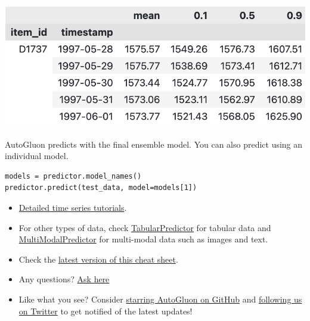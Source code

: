\begin{center}
\includegraphics[width=0.6\linewidth]{timeseries/images/predictions.png}
\end{center}

\medskip

AutoGluon predicts with the final ensemble model. You can also predict using an individual model. 

\begin{verbatim}
models = predictor.model_names()
predictor.predict(test_data, model=models[1])
\end{verbatim}




\begin{itemize}
  \item \href{https://auto.gluon.ai/stable/tutorials/timeseries/index.html}{Detailed  time series tutorials}.
  \item For other types of data, check
  \href{https://auto.gluon.ai/stable/tutorials/tabular/index.html}{TabularPredictor} for tabular data and 
  \href{https://auto.gluon.ai/stable/tutorials/multimodal/index.html}{MultiModalPredictor} for multi-modal data such as images and text. 
  \item Check the \href{https://auto.gluon.ai/stable/cheatsheet.html}{latest version of this cheat sheet}.
  \item Any questions? \href{https://github.com/autogluon/autogluon/discussions}{Ask here}
  \item Like what you see? Consider \href{https://github.com/autogluon/autogluon/stargazers}{starring AutoGluon on GitHub} and \href{https://twitter.com/autogluon}{following us on Twitter} to get notified of the latest updates!
\end{itemize}


\raggedcolumns


